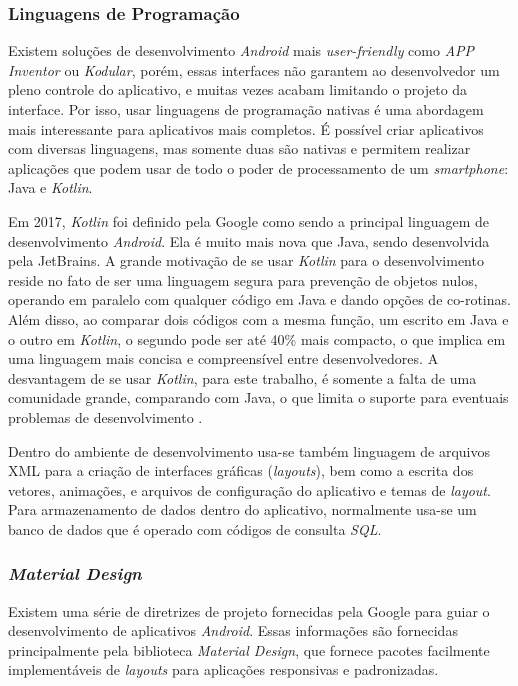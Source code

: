 \subsubsection{Linguagens de Programação}

Existem soluções de desenvolvimento \textit{Android} mais \textit{user-friendly} como \textit{APP Inventor} ou \textit{Kodular}, porém, essas interfaces não garantem ao desenvolvedor um pleno controle do aplicativo, e muitas vezes acabam limitando o projeto da interface. Por isso, usar linguagens de programação nativas é uma abordagem mais interessante para aplicativos mais completos. É possível criar aplicativos com diversas linguagens, mas somente duas são nativas e permitem realizar aplicações que podem usar de todo o poder de processamento de um \textit{smartphone}: Java e \textit{Kotlin}.

Em 2017, \textit{Kotlin} foi definido pela Google como sendo a principal linguagem de desenvolvimento \textit{Android}. Ela é muito mais nova que Java, sendo desenvolvida pela JetBrains. A grande motivação de se usar \textit{Kotlin} para o desenvolvimento reside no fato de ser uma linguagem segura para prevenção de objetos nulos, operando em paralelo com qualquer código em Java e dando opções de co-rotinas. Além disso, ao comparar dois códigos com a mesma função, um escrito em Java e o outro em \textit{Kotlin}, o segundo pode ser até 40\% mais compacto, o que implica em uma linguagem mais concisa e compreensível entre desenvolvedores. A desvantagem de se usar \textit{Kotlin}, para este trabalho, é somente a falta de uma comunidade grande, comparando com Java, o que limita o suporte para eventuais problemas de desenvolvimento \cite{site:kotlinxjava}.

Dentro do ambiente de desenvolvimento usa-se também linguagem de arquivos XML para a criação de interfaces gráficas (\textit{layouts}), bem como a escrita dos vetores, animações, e arquivos de configuração do aplicativo e temas de \textit{layout}. Para armazenamento de dados dentro do aplicativo, normalmente usa-se um banco de dados que é operado com códigos de consulta \textit{SQL}.

\subsubsection{\textit{Material Design}}
Existem uma série de diretrizes de projeto fornecidas pela Google para guiar o desenvolvimento de aplicativos \textit{Android}. Essas informações são fornecidas principalmente pela biblioteca \textit{Material Design}, que fornece pacotes facilmente implementáveis de \textit{layouts} para aplicações responsivas e padronizadas.

